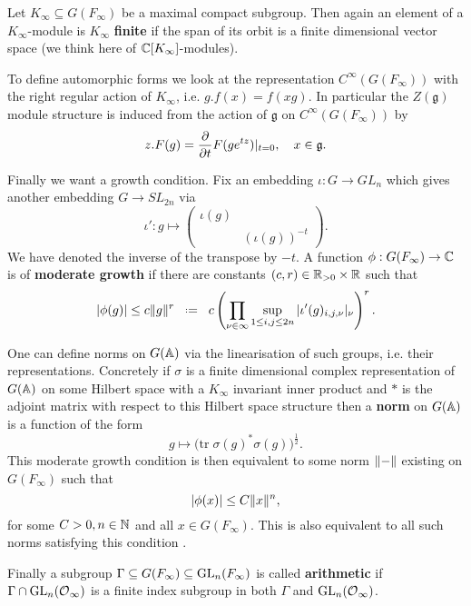 	Let \(K_\infty\subseteq  G(F_\infty)\) be a maximal compact subgroup. Then again an element of a \(K_\infty\)-module is \(K_\infty\) \textbf{finite} if the span of its orbit is a finite dimensional vector space (we think here of \(\C[K_\infty]\)-modules).

	To define automorphic forms we look at the representation \(C^\infty(G(F_\infty))\) with the right regular action of \(K_\infty\), i.e. \(g.f(x) = f(xg)\).  In particular the \(Z(\mathfrak{g})\) module structure is induced from the action of \(\mathfrak{g}\) on \(C^\infty(G(F_\infty))\) by \label{lie_algebra_action}
	\[z.F(g) = \frac{\partial }{\partial t}F(ge^{tz})|_{t=0}, \quad x\in \mathfrak{g}.\] 
	
	Finally we want a growth condition. Fix an embedding \(\iota : G\to GL_n\) which gives another embedding \(G\to SL_{2n}\) via
	\[\iota': g\mapsto \begin{pmatrix}
		\iota (g) & \\
		& (\iota (g))^{-t}
	\end{pmatrix}.\]
	We have denoted the inverse of the transpose by \(-t\). A function \(\phi : G(F_\infty) \to \C \) is of \textbf{moderate growth} if there are constants \((c,r)\in \R_{>0}\times \R\) such that 
	\[|\phi(g)| \leq c\norm{g}^r \defeq c \left(\prod_{\nu\in\infty} \sup_{1\leq i, j\leq 2n} |\iota' (g)_{i,j, \nu}|_\nu\right)^r.\]

	\begin{remark}
		One can define norms on \(G(\A)\) via the linearisation of such groups, i.e. their representations. Concretely if \(\sigma\) is a finite dimensional complex representation of \(G(\A)\) on some Hilbert space with a \(K_\infty\) invariant inner product and \(\ast\) is the adjoint matrix with respect to this Hilbert space structure then a \textbf{norm} on \(G(\A)\) is a function of the form
		\[g\mapsto \big(\mathrm{tr }\; \sigma(g)^*\sigma(g)\big)^{\frac{1}{2}}.\]
		This moderate growth condition is then equivalent to some norm \(\lVert  -  \rVert\) existing on \(G(F_\infty)\) such that 
		\[|\phi(x)| \leq C\norm{x}^n,\]
		for some \(C>0, n\in \N\) and all \(x\in G(F_\infty)\). This is also equivalent to all such norms satisfying this condition \cite[Part 1, ``Automorphic Forms and Automorphic Representations'', 1.2]{borelAutomorphicFormsRepresentations1979}.
	\end{remark}
	
	Finally a subgroup \(\Gamma \subseteq G(F_\infty)\subseteq \operatorname{GL}_n(F_\infty)\) is called \textbf{arithmetic} if \(\Gamma \cap \GL_n(\Struc_\infty)\) is a finite index subgroup in both \(\Gamma\) and \(\GL_n(\Struc_\infty)\).

